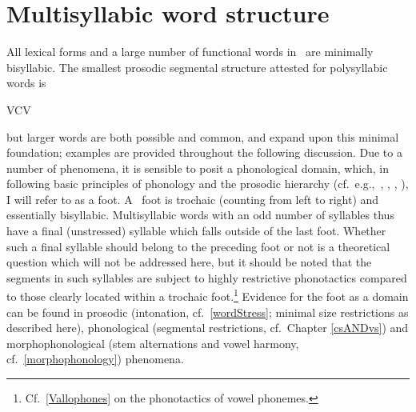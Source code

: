 \section{Multisyllabic word structure}\label{polysyllabicWords}
All lexical forms and a large number of functional words in \PS\ are minimally bisyllabic. The smallest prosodic segmental structure attested for polysyllabic words is \begin{center}VCV\end{center} but larger words are both possible and common, and expand upon this minimal foundation; examples are provided throughout the following discussion. Due to a number of phenomena, it is sensible to posit a phonological domain, which, in following basic principles of phonology %
and the prosodic hierarchy %
(cf.~e.g.,~\citealt[280-283]{dixon2010a}, \citealt{Selkirk1980}, \citealt{Hayes1989}, \citealt{NesporVogel1986}), I will refer to as a {foot}. A \PS\ foot is trochaic (counting from left to right) and essentially bisyllabic. Multisyllabic words with an odd number of syllables thus have a final (unstressed) syllable which falls outside of the last foot. 
Whether such a final syllable should belong to the preceding foot or not is a theoretical question which will not be addressed here, but it should be noted that the segments in such syllables are subject to highly restrictive phonotactics compared to those clearly located within a trochaic foot.\footnote{Cf.~\SEC\ref{Vallophones} on the phonotactics of vowel phonemes.} 
Evidence for the foot as a domain can be found in prosodic (intonation, cf.~\SEC\ref{wordStress}; minimal size restrictions as described here), phonological (segmental restrictions, cf.~Chapter \ref{csANDvs}) and morphophonological (stem alternations and vowel harmony, cf.~\SEC\ref{morphophonology}) phenomena. 



